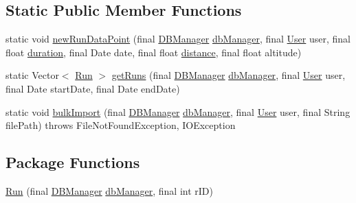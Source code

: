 \subsection*{Static Public Member Functions}
\begin{DoxyCompactItemize}
\item 
static void \mbox{\hyperlink{classcom_1_1activitytracker_1_1_run_a5dea6f1860431103d553ce770382afe0}{new\+Run\+Data\+Point}} (final \mbox{\hyperlink{classcom_1_1activitytracker_1_1_d_b_manager}{D\+B\+Manager}} \mbox{\hyperlink{classcom_1_1activitytracker_1_1_run_ab90e32eda9f4c671ae3575f971edca6b}{db\+Manager}}, final \mbox{\hyperlink{classcom_1_1activitytracker_1_1_user}{User}} user, final float \mbox{\hyperlink{classcom_1_1activitytracker_1_1_run_a5e38d293d29d4b65c9290ff4bee82e03}{duration}}, final Date date, final float \mbox{\hyperlink{classcom_1_1activitytracker_1_1_run_a7b4ca8c4ecea4da1653f03b8c8fc16a8}{distance}}, final float altitude)
\item 
static Vector$<$ \mbox{\hyperlink{classcom_1_1activitytracker_1_1_run}{Run}} $>$ \mbox{\hyperlink{classcom_1_1activitytracker_1_1_run_a1aa1fb01eabff586e16d88f19f7df743}{get\+Runs}} (final \mbox{\hyperlink{classcom_1_1activitytracker_1_1_d_b_manager}{D\+B\+Manager}} \mbox{\hyperlink{classcom_1_1activitytracker_1_1_run_ab90e32eda9f4c671ae3575f971edca6b}{db\+Manager}}, final \mbox{\hyperlink{classcom_1_1activitytracker_1_1_user}{User}} user, final Date start\+Date, final Date end\+Date)
\item 
static void \mbox{\hyperlink{classcom_1_1activitytracker_1_1_run_a8e2b13e0096b87614d5333ec15213300}{bulk\+Import}} (final \mbox{\hyperlink{classcom_1_1activitytracker_1_1_d_b_manager}{D\+B\+Manager}} \mbox{\hyperlink{classcom_1_1activitytracker_1_1_run_ab90e32eda9f4c671ae3575f971edca6b}{db\+Manager}}, final \mbox{\hyperlink{classcom_1_1activitytracker_1_1_user}{User}} user, final String file\+Path)  throws File\+Not\+Found\+Exception, I\+O\+Exception 
\end{DoxyCompactItemize}
\subsection*{Package Functions}
\begin{DoxyCompactItemize}
\item 
\mbox{\hyperlink{classcom_1_1activitytracker_1_1_run_a5568c1c514835056d2abc22cfba222c5}{Run}} (final \mbox{\hyperlink{classcom_1_1activitytracker_1_1_d_b_manager}{D\+B\+Manager}} \mbox{\hyperlink{classcom_1_1activitytracker_1_1_run_ab90e32eda9f4c671ae3575f971edca6b}{db\+Manager}}, final int r\+ID)
\end{DoxyCompactItemize}
